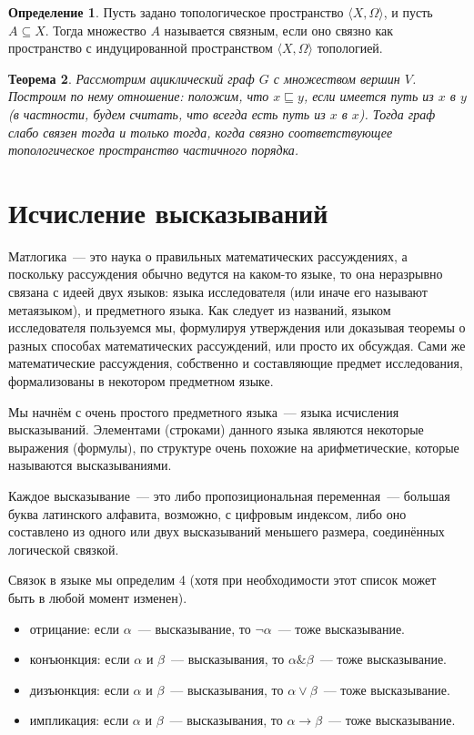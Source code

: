 \documentclass[a4paper,11pt]{article}
\newtheorem{thm}{Теорема}[section]
\theoremstyle{definition}
\newtheorem{dfn}[thm]{Определение}
\begin{document}
\begin{dfn}
Пусть задано топологическое пространство $\langle X, \Omega\rangle$, и пусть
$A \subseteq X$. Тогда множество $A$ называется связным, если оно связно как
пространство с индуцированной пространством $\langle X, \Omega\rangle$
топологией.
\end{dfn}

\begin{thm}
Рассмотрим ациклический граф $G$ с множеством вершин $V$. Построим по нему
отношение: положим, что $x \sqsubseteq y$, если имеется путь из $x$ в $y$ (в
частности, будем считать, что всегда есть путь из $x$ в $x$). Тогда граф слабо
связен тогда и только тогда, когда связно соответствующее топологическое
пространство частичного порядка.
\end{thm}

\section{Исчисление высказываний}
Матлогика~--- это наука о правильных математических рассуждениях, а поскольку
рассуждения обычно ведутся на каком-то языке, то она неразрывно связана с идеей
двух языков: языка исследователя (или иначе его называют метаязыком), и
предметного языка. Как следует из названий, языком исследователя пользуемся мы,
формулируя утверждения или доказывая теоремы о разных способах математических
рассуждений, или просто их обсуждая. Сами же математические рассуждения,
собственно и составляющие предмет исследования, формализованы в некотором
предметном языке.

Мы начнём с очень простого предметного языка~--- языка исчисления высказываний.
Элементами (строками) данного языка являются некоторые выражения (формулы), по
структуре очень похожие на арифметические, которые называются высказываниями.

Каждое высказывание~--- это либо пропозициональная переменная~--- большая буква
латинского алфавита, возможно, с цифровым индексом, либо оно составлено из
одного или двух высказываний меньшего размера, соединённых логической связкой.

Связок в языке мы определим 4 (хотя при необходимости этот список может быть в
любой момент изменен).
\begin{itemize}
\item отрицание: если $\alpha$~--- высказывание, то $\neg\alpha$~--- тоже
  высказывание.
\item конъюнкция: если $\alpha$ и $\beta$~--- высказывания, то $\alpha\mathbin{\&}\beta$~---
  тоже высказывание.
\item дизъюнкция: если $\alpha$ и $\beta$~--- высказывания, то $\alpha\vee\beta$~---
  тоже высказывание.
\item импликация: если $\alpha$ и $\beta$~--- высказывания, то $\alpha\to\beta$~---
  тоже высказывание.
\end{itemize}
\end{document}
